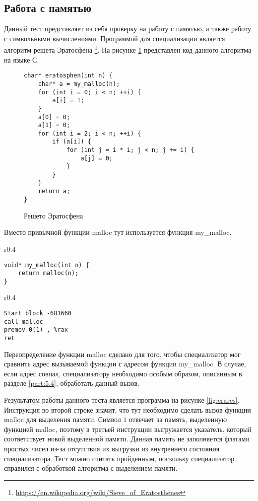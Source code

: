 \documentclass{spbau-diploma}
\begin{document}
\subsection{ Работа с памятью}

Данный тест представляет из себя проверку на работу с памятью, а также работу с символьными вычислениями. Программой для специализации является алгоритм решета Эратосфена \footnote{\url{https://en.wikipedia.org/wiki/Sieve_of_Eratosthenes}}. На рисунке \ref{fig:era} представлен код данного алгоритма на языке С.
\begin{figure}[h]
\begin{lstlisting}[xleftmargin = 20pt]
char* eratosphen(int n) {
    char* a = my_malloc(n);
    for (int i = 0; i < n; ++i) {
        a[i] = 1;
    }
    a[0] = 0;
    a[1] = 0;
    for (int i = 2; i < n; ++i) {
        if (a[i]) {
            for (int j = i * i; j < n; j += i) {
                a[j] = 0;
            }
        }
    }
    return a;
}
\end{lstlisting}
\caption{ Решето Эратосфена}
\label{fig:era}
\end{figure}
Вместо привычной функции malloc тут используется функция my\_malloc.
\begin{wrapfigure}{r}{0.4\textwidth}
\begin{lstlisting}[xleftmargin = 20pt]
void* my_malloc(int n) {
    return malloc(n);
}
\end{lstlisting}
\caption{ Функция my\_malloc}
\end{wrapfigure}
\begin{wrapfigure}{r}{0.4\textwidth}
\begin{lstlisting}[xleftmargin = 20pt]
Start block -681660
call malloc
premov 0(1) , %rax 
ret
\end{lstlisting}
\caption{Результат специализации}
\label{fig:erares}
\end{wrapfigure}
Переопределение функции malloc сделано для того, чтобы специализатор мог сравнить адрес вызываемой функции с адресом функции my\_malloc. В случае, если адрес совпал, специализатору необходимо особым образом, описанным в разделе \ref{part:5.4}, обработать данный вызов.


Результатом работы данного теста является программа на рисунке \ref{fig:erares}.
Инструкция во второй строке значит, что тут необходимо сделать вызов функции malloc для выделения памяти. Символ $1$ отвечает за память, выделенную функцией malloc, поэтому в третьей инструкции выгружается указатель, который соответствует новой выделенной памяти. Данная память не заполняется флагами простых чисел из-за отсутствия их выгрузки из внутреннего состояния специализатора. Тест можно считать пройденным, поскольку специализатор справился с обработкой алгоритма с выделением памяти.
\end{document}
